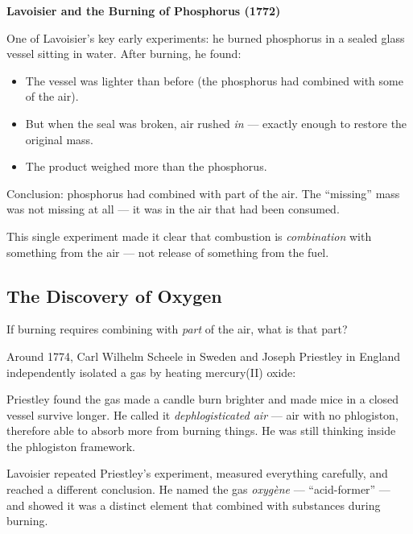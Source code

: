 \documentclass[12pt, a4paper]{book}
\theoremstyle{definition}
\begin{document}
\begin{historybox}
\textbf{Lavoisier and the Burning of Phosphorus (1772)}

One of Lavoisier's key early experiments:
he burned phosphorus in a sealed glass vessel sitting in water.
After burning, he found:
\begin{itemize}[nosep]
  \item The vessel was lighter than before
        (the phosphorus had combined with some of the air).
  \item But when the seal was broken,
        air rushed \emph{in} — exactly enough to restore the original mass.
  \item The product weighed more than the phosphorus.
\end{itemize}

Conclusion: phosphorus had combined with part of the air.
The ``missing'' mass was not missing at all — it was in the air
that had been consumed.

\begin{center}
\end{center}

This single experiment made it clear that combustion is \emph{combination}
with something from the air — not release of something from the fuel.
\end{historybox}

\subsection{The Discovery of Oxygen}

If burning requires combining with \emph{part} of the air,
what is that part?

Around 1774, Carl Wilhelm Scheele in Sweden and
Joseph Priestley in England independently isolated a gas
by heating mercury(II) oxide:

\begin{center}
\end{center}

Priestley found the gas made a candle burn brighter
and made mice in a closed vessel survive longer.
He called it \emph{dephlogisticated air} — air with no phlogiston,
therefore able to absorb more from burning things.
He was still thinking inside the phlogiston framework.

Lavoisier repeated Priestley's experiment, measured everything
carefully, and reached a different conclusion.
He named the gas \emph{oxygène} — ``acid-former'' —
and showed it was a distinct element
that combined with substances during burning.
\end{document}
